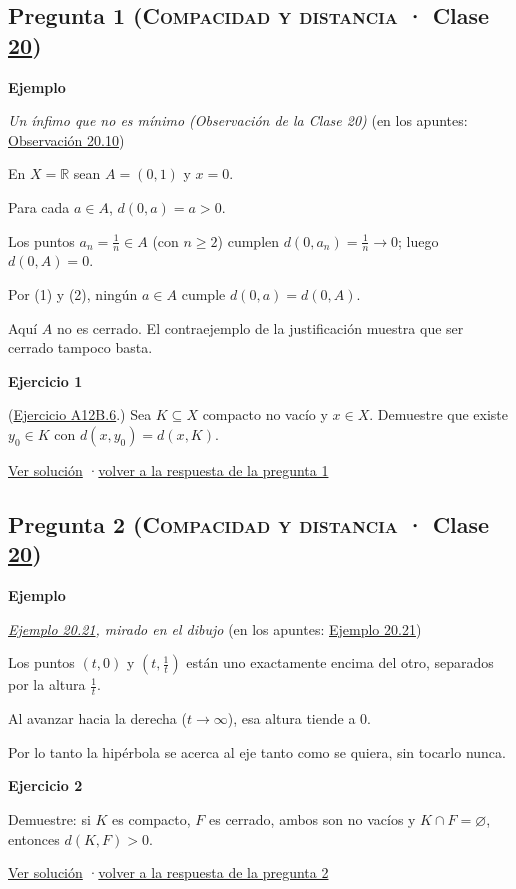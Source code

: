 \documentclass[11pt,a4paper]{article}
\newcommand{\R}{\mathbb{R}}\newcommand{\N}{\mathbb{N}}\newcommand{\Q}{\mathbb{Q}}
\newcommand{\bloque}[1]{\par\smallskip\noindent\textbf{\color{acento}#1}\par}
\begin{document}
\subsection*{\hypertarget{e-1}{}Pregunta 1 \normalfont\small(\textsc{Compacidad y distancia} · Clase \href{https://decostruttivismo.github.io/MAT2514-repaso/pdf/MAT2514_apuntes_completos.pdf\#nameddest=section.20}{20})}
\bloque{Ejemplo}
\textit{Un ínfimo que no es mínimo (Observación de la Clase 20)} {\small(en los apuntes: \href{https://decostruttivismo.github.io/MAT2514-repaso/pdf/MAT2514_apuntes_completos.pdf\#nameddest=teorema.20.10}{Observación 20.10})}
\begin{pasos}
\item[] En $X=\R$ sean $A=(0,1)$ y $x=0$.
\item[(1)] Para cada $a\in A$, $d(0,a)=a\gt 0$.
\item[(2)] Los puntos $a_n=\frac1n\in A$ (con $n\ge2$) cumplen $d(0,a_n)=\frac1n\to0$; luego $d(0,A)=0$.
\item[] Por (1) y (2), ningún $a\in A$ cumple $d(0,a)=d(0,A)$.
\item[] Aquí $A$ no es cerrado. El contraejemplo de la justificación muestra que ser cerrado tampoco basta.
\end{pasos}
\bloque{\hypertarget{x-1}{}Ejercicio 1}
(\href{https://decostruttivismo.github.io/MAT2514-repaso/pdf/MAT2514_apuntes_completos.pdf\#nameddest=ejercicio.A12B.6}{Ejercicio A12B.6}.) Sea $K\subseteq X$ compacto no vacío y $x\in X$. Demuestre que existe $y_0\in K$ con $d(x,y_0)=d(x,K)$.
\par{\small \hyperlink{s-1}{Ver solución} \quad·\quad \hyperlink{r-1}{volver a la respuesta de la pregunta 1}}
\subsection*{\hypertarget{e-2}{}Pregunta 2 \normalfont\small(\textsc{Compacidad y distancia} · Clase \href{https://decostruttivismo.github.io/MAT2514-repaso/pdf/MAT2514_apuntes_completos.pdf\#nameddest=section.20}{20})}
\bloque{Ejemplo}
\textit{\href{https://decostruttivismo.github.io/MAT2514-repaso/pdf/MAT2514_apuntes_completos.pdf\#nameddest=teorema.20.21}{Ejemplo 20.21}, mirado en el dibujo} {\small(en los apuntes: \href{https://decostruttivismo.github.io/MAT2514-repaso/pdf/MAT2514_apuntes_completos.pdf\#nameddest=teorema.20.21}{Ejemplo 20.21})}
\begin{pasos}
\item[] Los puntos $(t,0)$ y $(t,\frac1t)$ están uno exactamente encima del otro, separados por la altura $\frac1t$.
\item[] Al avanzar hacia la derecha ($t\to\infty$), esa altura tiende a $0$.
\item[] Por lo tanto la hipérbola se acerca al eje tanto como se quiera, sin tocarlo nunca.
\end{pasos}
\bloque{\hypertarget{x-2}{}Ejercicio 2}
Demuestre: si $K$ es compacto, $F$ es cerrado, ambos son no vacíos y $K\cap F=\varnothing$, entonces $d(K,F)\gt 0$.
\par{\small \hyperlink{s-2}{Ver solución} \quad·\quad \hyperlink{r-2}{volver a la respuesta de la pregunta 2}}
\end{document}
